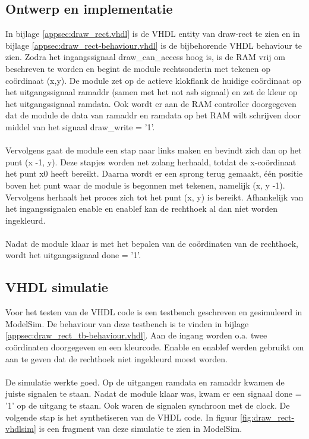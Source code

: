\documentclass{scrartcl} %
\begin{document}
\subsection{Ontwerp en implementatie}
In bijlage \ref{appsec:draw_rect.vhdl} is de VHDL entity van draw-rect te zien en in bijlage \ref{appsec:draw_rect-behaviour.vhdl} is de bijbehorende VHDL behaviour te zien. Zodra het ingangssignaal draw\_can\_access hoog is, is de RAM vrij om beschreven te worden en begint de module rechtsonderin met tekenen op coördinaat (x,y). De module zet op de actieve klokflank de huidige coördinaat op het uitgangssignaal ramaddr (samen met het not asb signaal) en zet de kleur op het uitgangssignaal ramdata. Ook wordt er aan de RAM controller doorgegeven dat de module de data van ramaddr en ramdata op het RAM wilt schrijven door middel van het signaal draw\_write = '1'.
\\\\
Vervolgens gaat de module een stap naar links maken en bevindt zich dan op het punt (x -1, y). Deze stapjes worden net zolang herhaald, totdat de x-coördinaat het punt x0 heeft bereikt. Daarna wordt er een sprong terug gemaakt, één positie boven het punt waar de module is begonnen met tekenen, namelijk (x, y -1). Vervolgens herhaalt het proces zich tot het punt (x, y) is bereikt. Afhankelijk van het ingangssignalen enable en enablef kan de rechthoek al dan niet worden ingekleurd.
\\\\
Nadat de module klaar is met het bepalen van de coördinaten van de rechthoek, wordt het uitgangssignaal done = '1'.

\subsection{VHDL simulatie}
Voor het testen van de VHDL code is een testbench geschreven en gesimuleerd in ModelSim. De behaviour van deze testbench is te vinden in bijlage \ref{appsec:draw_rect_tb-behaviour.vhdl}. Aan de ingang worden o.a. twee coördinaten doorgegeven en een kleurcode. Enable en enablef werden gebruikt om aan te geven dat de rechthoek niet ingekleurd moest worden.
\\\\
De simulatie werkte goed. Op de uitgangen ramdata en ramaddr kwamen de juiste signalen te staan. Nadat de module klaar was, kwam er een signaal done = '1' op de uitgang te staan. Ook waren de signalen synchroon met de clock. De volgende stap is het synthetiseren van de VHDL code. In figuur \ref{fig:draw_rect-vhdlsim} is een fragment van deze simulatie te zien in ModelSim.
\\\\
\end{document}
